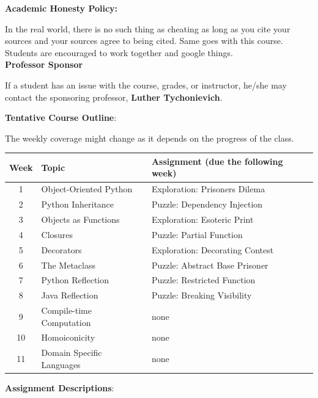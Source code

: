 \documentclass[11pt]{article}
\begin{document}
\textbf {\large Academic Honesty Policy:} 

In the real world, there is no such thing as cheating as long as you cite your sources and your sources agree to being cited. Same goes with this course. Students are encouraged to work together and google things. 
\\

\textbf {\large Professor Sponsor}

If a student has an issue with the course, grades, or instructor, he/she may contact the sponsoring professor, \textbf{Luther Tychonievich}.

\newpage
\textbf {\large Tentative Course Outline}:

The weekly coverage might change as it depends on the progress of the class. 

\begin{center}
\begin{tabular}{c | l | l}
\textbf{Week} & \textbf{Topic} & \textbf{Assignment} (due the following week)  \\
\hline 1 & Object-Oriented Python  & Exploration: Prisoners Dilema \\
2 & Python Inheritance & Puzzle: Dependency Injection \\
3 & Objects as Functions & Exploration: Esoteric Print  \\
4 & Closures & Puzzle: Partial Function\\
5 & Decorators & Exploration: Decorating Contest\\
6 & The Metaclass &  Puzzle: Abstract Base Prisoner\\
7 & Python Reflection & Puzzle: Restricted Function \\
8 & Java Reflection & Puzzle: Breaking Visibility \\
9 & Compile-time Computation & none \\
10 & Homoiconicity &  none\\
11 & Domain Specific Languages &  none
\end{tabular}
\end{center}

\vspace{10mm}

\textbf {\large Assignment Descriptions}:
\end{document}
